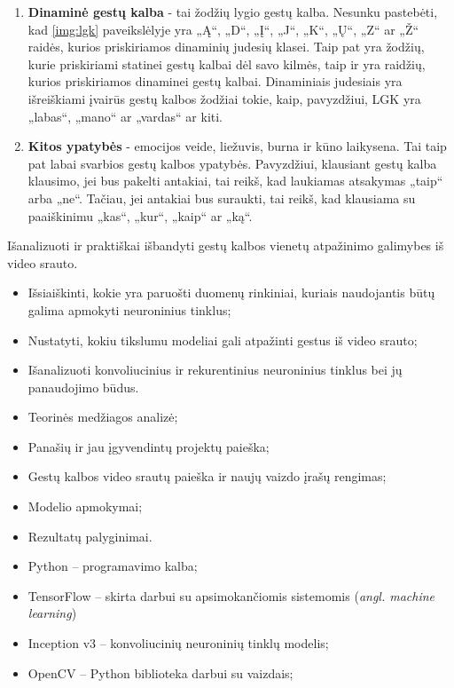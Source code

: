 \documentclass{VUMIFPSbakalaurinis}
\begin{document}
\begin{enumerate}
	\item\textbf{Dinaminė gestų kalba} - tai žodžių lygio gestų kalba. Nesunku pastebėti, kad \ref{img:lgk} paveikslėlyje yra „Ą“, „D“, „Į“, „J“, „K“, „Ų“, „Z“ ar „Ž“ raidės, kurios priskiriamos dinaminių judesių klasei. Taip pat yra žodžių, kurie priskiriami statinei gestų kalbai dėl savo kilmės, taip ir yra raidžių, kurios priskiriamos dinaminei gestų kalbai. Dinaminiais judesiais yra išreiškiami įvairūs gestų kalbos žodžiai tokie, kaip, pavyzdžiui, LGK yra „labas“, „mano“ ar „vardas“ ar kiti.
	
	\item\textbf{Kitos ypatybės} - emocijos veide, liežuvis, burna ir kūno laikysena. Tai taip pat labai svarbios gestų kalbos ypatybės. Pavyzdžiui, klausiant gestų kalba klausimo, jei bus pakelti antakiai, tai reikš, kad laukiamas atsakymas „taip“ arba „ne“. Tačiau, jei antakiai bus suraukti, tai reikš, kad klausiama su paaiškinimu „kas“, „kur“, „kaip“ ar „ką“.
\end{enumerate}


Išanalizuoti ir praktiškai išbandyti gestų kalbos vienetų atpažinimo galimybes iš video srauto.

\begin{itemize}
	\item Išsiaiškinti, kokie yra paruošti duomenų rinkiniai, kuriais naudojantis būtų galima apmokyti neuroninius tinklus;
	\item Nustatyti, kokiu tikslumu modeliai gali atpažinti gestus iš video srauto;
	\item Išanalizuoti konvoliucinius ir rekurentinius neuroninius tinklus bei jų panaudojimo būdus.
\end{itemize}

\begin{itemize}
	\item Teorinės medžiagos analizė;
	\item Panašių ir jau įgyvendintų projektų paieška;
	\item Gestų kalbos video srautų paieška ir naujų vaizdo įrašų rengimas;
	\item Modelio apmokymai;
	\item Rezultatų palyginimai.
\end{itemize}

\begin{itemize}
	\item Python – programavimo kalba;
	\item TensorFlow – skirta darbui su apsimokančiomis sistemomis (\textit{angl. machine learning})
	\item Inception v3 – konvoliucinių neuroninių tinklų modelis;
	\item OpenCV – Python biblioteka darbui su vaizdais;
\end{itemize}
\end{document}
